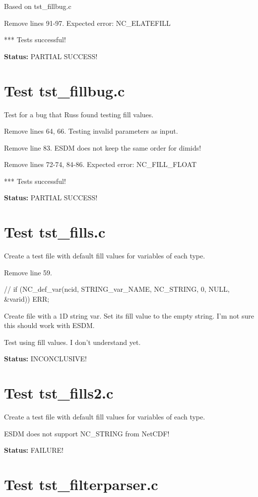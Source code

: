 Based on tst\_fillbug.c

Remove lines 91-97. Expected error: NC\_ELATEFILL

*** Tests successful!

{\bf \large Status: } PARTIAL SUCCESS!

\section{Test tst\_fillbug.c}

Test for a bug that Russ found testing fill values.

Remove lines 64, 66. Testing invalid parameters as input.

Remove line 83. ESDM does not keep the same order for dimids!

Remove lines 72-74, 84-86. Expected error: NC\_FILL\_FLOAT

*** Tests successful!

{\bf \large Status: } PARTIAL SUCCESS!

\section{Test tst\_fills.c}

Create a test file with default fill values for variables of each type.

Remove line 59.

// if (NC\_def\_var(ncid, STRING\_var\_NAME, NC\_STRING, 0, NULL, \&varid)) ERR;

Create file with a 1D string var. Set its fill value to the empty string.
I'm not sure this should work with ESDM.

Test using fill values. I don't understand yet.

{\bf \large Status: } INCONCLUSIVE!

\section{Test tst\_fills2.c}

Create a test file with default fill values for variables of each type.

ESDM does not support NC\_STRING from NetCDF!

{\bf \large Status: } FAILURE!

\section{Test tst\_filterparser.c}

